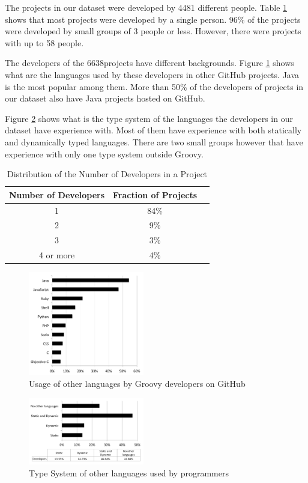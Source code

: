 \documentclass[preprint]{sigplanconf}
\begin{document}
The projects in our dataset were developed by 4481 different people. 
Table \ref{tab:number_of_developers} shows that most projects were developed by a single person.
96\% of the projects were developed by small groups of 3 people or less.
However, there were projects with up to 58 people.

The developers of the 6638projects have different backgrounds.
Figure \ref{fig:other_languages} shows what are the languages used by these developers in other GitHub projects. 
Java is the most popular among them.
More than 50\% of the developers of projects in our dataset also have Java projects hosted on GitHub.

Figure \ref{fig:typeSystem_background} shows what is the type system of the languages the developers in our dataset have experience with.
Most of them have experience with both statically and dynamically typed languages.
There are two small groups however that have experience with only one type system outside Groovy.
 
\begin{table}[ht]
\caption{Distribution of the Number of Developers in a Project}
\centering{}%
\begin{tabular}{|c|c|c|}
\hline 
Number of Developers & Fraction of Projects\tabularnewline
\hline 
\hline 
1 & 84\%\tabularnewline
\hline 
2 & 9\%\tabularnewline
\hline 
3 & 3\%\tabularnewline
\hline 
4 or more & 4\%\tabularnewline
\hline 
\end{tabular}
\label{tab:number_of_developers}
\end{table}

\begin{figure}[ht]
\centering \includegraphics[width=0.45\textwidth]{other_languages}
\caption{Usage of other languages by Groovy developers on GitHub}
\label{fig:other_languages} 
\end{figure}

\begin{figure}[ht]
\centering \includegraphics[width=0.45\textwidth]{typeSystem_background}
\caption{Type System of other languages used by programmers}
\label{fig:typeSystem_background} 
\end{figure}
\end{document}
